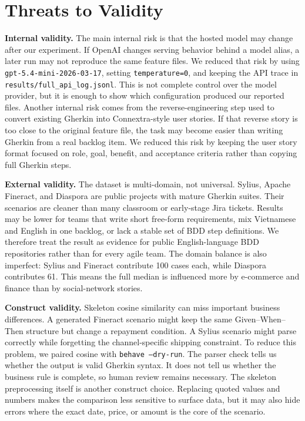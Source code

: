 \section{Threats to Validity}
\label{sec:threats}

\textbf{Internal validity.} The main internal risk is that the hosted model may change after our experiment. If OpenAI changes serving behavior behind a model alias, a later run may not reproduce the same feature files. We reduced that risk by using \texttt{gpt-5.4-mini-2026-03-17}, setting \texttt{temperature=0}, and keeping the API trace in \texttt{results/full\_api\_log.jsonl}. This is not complete control over the model provider, but it is enough to show which configuration produced our reported files. Another internal risk comes from the reverse-engineering step used to convert existing Gherkin into Connextra-style user stories. If that reverse story is too close to the original feature file, the task may become easier than writing Gherkin from a real backlog item. We reduced this risk by keeping the user story format focused on role, goal, benefit, and acceptance criteria rather than copying full Gherkin steps.

\textbf{External validity.} The dataset is multi-domain, not universal. Sylius, Apache Fineract, and Diaspora are public projects with mature Gherkin suites. Their scenarios are cleaner than many classroom or early-stage Jira tickets. Results may be lower for teams that write short free-form requirements, mix Vietnamese and English in one backlog, or lack a stable set of BDD step definitions. We therefore treat the result as evidence for public English-language BDD repositories rather than for every agile team. The domain balance is also imperfect: Sylius and Fineract contribute 100 cases each, while Diaspora contributes 61. This means the full median is influenced more by e-commerce and finance than by social-network stories.

\textbf{Construct validity.} Skeleton cosine similarity can miss important business differences. A generated Fineract scenario might keep the same Given--When--Then structure but change a repayment condition. A Sylius scenario might parse correctly while forgetting the channel-specific shipping constraint. To reduce this problem, we paired cosine with \texttt{behave --dry-run}. The parser check tells us whether the output is valid Gherkin syntax. It does not tell us whether the business rule is complete, so human review remains necessary. The skeleton preprocessing itself is another construct choice. Replacing quoted values and numbers makes the comparison less sensitive to surface data, but it may also hide errors where the exact date, price, or amount is the core of the scenario.

